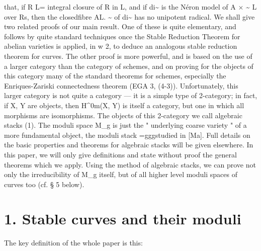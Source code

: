\documentclass[11pt]{article}
\theoremstyle{plain}
\theoremstyle{definition}
\theoremstyle{remark}
\begin{document}
that, if R L= integral closure of R in L, and if di\textasciitilde{} is the N\'eron model of A $\times$ \textasciitilde{} L over Rs, then the closedfibre AL. \textasciitilde{} of di\textasciitilde{} has no unipotent radical. We shall give two related proofs of our main result. One of these is quite elementary, and follows by quite standard techniques once the Stable Reduction Theorem for abelian varieties is applied, in w 2, to deduce an analogous stable reduction theorem for curves. The other proof is more powerful, and is based on the use of a larger category than the category of schemes, and on proving for the objects of this category many of the standard theorems for schemes, especially the Enriques-Zariski connectedness theorem (EGA 3, (4-3)). Unfortunately, this larger category is not quite a category --- it is a simple type of 2-category; in fact, if X, Y are objects, then H\textasciicircum{}0m(X, Y) is itself a category, but one in which all morphisms are isomorphisms. The objects of this 2-category we call algebraic stacks (1). The moduli space M\_g is just the " underlying coarse variety " of a more fundamental object, the moduli stack =gggstudied in [Ma]. Full details on the basic properties and theorems for algebraic stacks will be given elsewhere. In this paper, we will only give definitions and state without proof the general theorems which we apply. Using the method of algebraic stacks, we can prove not only the irreducibility of M\_g itself, but of all higher level moduli spaces of curves too (cf. § 5 below).

\section*{1. Stable curves and their moduli}
The key definition of the whole paper is this:
\end{document}
